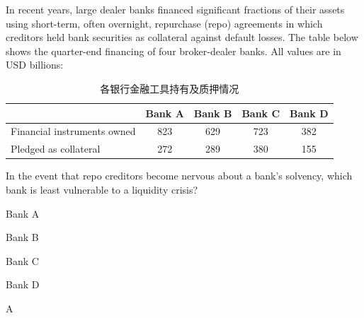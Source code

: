 \documentclass{article}
\newcounter{question} %
\begin{document}
\begin{question}
    In recent years, large dealer banks financed significant fractions of their assets using short-term, often overnight, repurchase (repo) agreements in which creditors held bank securities as collateral against default losses. The table below shows the quarter-end financing of four broker-dealer banks. All values are in USD billions:

    \begin{table}[htbp]
        \centering
        \begin{tabular}{lcccc}
            \hline
            & \textbf{Bank A} & \textbf{Bank B} & \textbf{Bank C} & \textbf{Bank D} \\
            \hline
            Financial instruments owned & 823 & 629 & 723 & 382 \\
            Pledged as collateral       & 272 & 289 & 380 & 155 \\
            \hline
        \end{tabular}
        \caption{各银行金融工具持有及质押情况}
    \end{table}
    In the event that repo creditors become nervous about a bank's solvency, which bank is least vulnerable to a liquidity crisis?
\end{question}

\begin{choices}
    \item Bank A
    \item Bank B
    \item Bank C
    \item Bank D
\end{choices}

\begin{correctanswer}
    A
\end{correctanswer}
\end{document}
